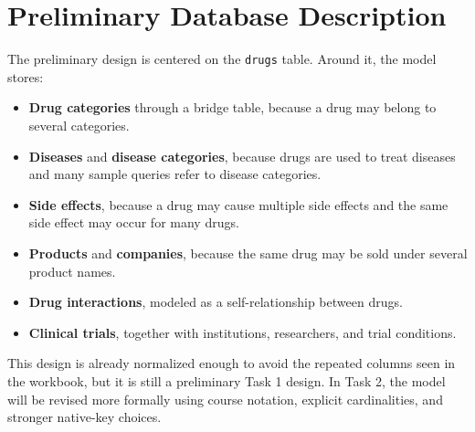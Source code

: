 \documentclass[12pt,a4paper]{article}
\begin{document}
\section{Preliminary Database Description}
The preliminary design is centered on the \texttt{drugs} table. Around it, the model stores:

\begin{itemize}[leftmargin=1.5em]
    \item \textbf{Drug categories} through a bridge table, because a drug may belong to several categories.
    \item \textbf{Diseases} and \textbf{disease categories}, because drugs are used to treat diseases and many sample queries refer to disease categories.
    \item \textbf{Side effects}, because a drug may cause multiple side effects and the same side effect may occur for many drugs.
    \item \textbf{Products} and \textbf{companies}, because the same drug may be sold under several product names.
    \item \textbf{Drug interactions}, modeled as a self-relationship between drugs.
    \item \textbf{Clinical trials}, together with institutions, researchers, and trial conditions.
\end{itemize}

This design is already normalized enough to avoid the repeated columns seen in the workbook, but it
is still a preliminary Task 1 design. In Task 2, the model will be revised more formally using
course notation, explicit cardinalities, and stronger native-key choices.
\end{document}
